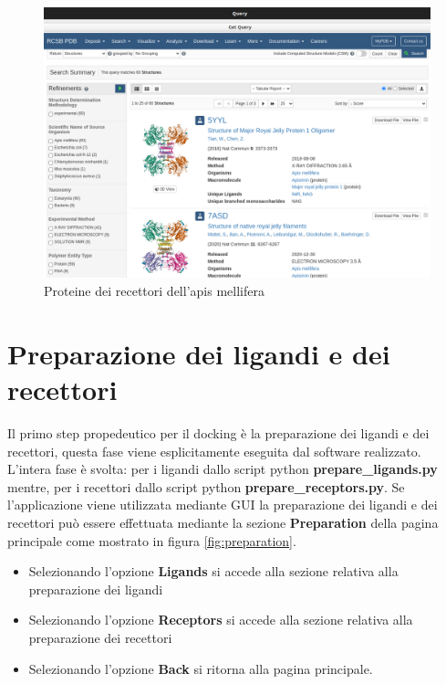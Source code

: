 \begin{figure}[H]
    \centering
    \includegraphics[scale=0.4]{immagini/fileRecettori.png}
    \caption{Proteine dei recettori dell'apis mellifera}
    \label{fig:fileRecettori}
\end{figure}

\section{Preparazione dei ligandi e dei recettori}
Il primo step propedeutico per il docking è la preparazione dei ligandi e dei recettori, questa
fase viene esplicitamente eseguita dal software realizzato. L'intera fase è svolta: per i ligandi dallo script python \textbf{prepare\_ligands.py} mentre, per i recettori dallo script python \textbf{prepare\_receptors.py}. Se l'applicazione viene utilizzata mediante GUI la preparazione dei ligandi e dei recettori può essere effettuata mediante la sezione \textbf{Preparation} della pagina principale come mostrato in figura \ref{fig:preparation}.

\begin{itemize}
    \item Selezionando l'opzione \textbf{Ligands} si accede alla sezione relativa alla preparazione dei ligandi
    \item Selezionando l'opzione \textbf{Receptors} si accede alla sezione relativa alla preparazione dei recettori
    \item Selezionando l'opzione \textbf{Back} si ritorna alla pagina principale.
\end{itemize}


